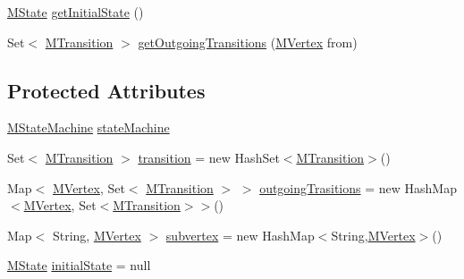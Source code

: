 \begin{DoxyCompactItemize}
\item 
\hyperlink{classorg_1_1tzi_1_1use_1_1uml_1_1mm_1_1statemachines_1_1_m_state}{M\-State} \hyperlink{classorg_1_1tzi_1_1use_1_1uml_1_1mm_1_1statemachines_1_1_m_region_a70cbf40280897244e43520925d189ca4}{get\-Initial\-State} ()
\item 
Set$<$ \hyperlink{classorg_1_1tzi_1_1use_1_1uml_1_1mm_1_1statemachines_1_1_m_transition}{M\-Transition} $>$ \hyperlink{classorg_1_1tzi_1_1use_1_1uml_1_1mm_1_1statemachines_1_1_m_region_a9e3f6533ed94322d263330b3c5cfa463}{get\-Outgoing\-Transitions} (\hyperlink{classorg_1_1tzi_1_1use_1_1uml_1_1mm_1_1statemachines_1_1_m_vertex}{M\-Vertex} from)
\end{DoxyCompactItemize}
\subsection*{Protected Attributes}
\begin{DoxyCompactItemize}
\item 
\hyperlink{classorg_1_1tzi_1_1use_1_1uml_1_1mm_1_1statemachines_1_1_m_state_machine}{M\-State\-Machine} \hyperlink{classorg_1_1tzi_1_1use_1_1uml_1_1mm_1_1statemachines_1_1_m_region_a97b6df0d73e6b6daa4c1684058a125c1}{state\-Machine}
\item 
Set$<$ \hyperlink{classorg_1_1tzi_1_1use_1_1uml_1_1mm_1_1statemachines_1_1_m_transition}{M\-Transition} $>$ \hyperlink{classorg_1_1tzi_1_1use_1_1uml_1_1mm_1_1statemachines_1_1_m_region_abd3bcba4d92d06c6b0962474302e6eaa}{transition} = new Hash\-Set$<$\hyperlink{classorg_1_1tzi_1_1use_1_1uml_1_1mm_1_1statemachines_1_1_m_transition}{M\-Transition}$>$()
\item 
Map$<$ \hyperlink{classorg_1_1tzi_1_1use_1_1uml_1_1mm_1_1statemachines_1_1_m_vertex}{M\-Vertex}, Set$<$ \hyperlink{classorg_1_1tzi_1_1use_1_1uml_1_1mm_1_1statemachines_1_1_m_transition}{M\-Transition} $>$ $>$ \hyperlink{classorg_1_1tzi_1_1use_1_1uml_1_1mm_1_1statemachines_1_1_m_region_aab3d4cbd873535285ab6cc0161cba8a5}{outgoing\-Trasitions} = new Hash\-Map$<$\hyperlink{classorg_1_1tzi_1_1use_1_1uml_1_1mm_1_1statemachines_1_1_m_vertex}{M\-Vertex}, Set$<$\hyperlink{classorg_1_1tzi_1_1use_1_1uml_1_1mm_1_1statemachines_1_1_m_transition}{M\-Transition}$>$$>$()
\item 
Map$<$ String, \hyperlink{classorg_1_1tzi_1_1use_1_1uml_1_1mm_1_1statemachines_1_1_m_vertex}{M\-Vertex} $>$ \hyperlink{classorg_1_1tzi_1_1use_1_1uml_1_1mm_1_1statemachines_1_1_m_region_aae24f4f3b13d9d4d6af46decbdb25876}{subvertex} = new Hash\-Map$<$String,\hyperlink{classorg_1_1tzi_1_1use_1_1uml_1_1mm_1_1statemachines_1_1_m_vertex}{M\-Vertex}$>$()
\item 
\hyperlink{classorg_1_1tzi_1_1use_1_1uml_1_1mm_1_1statemachines_1_1_m_state}{M\-State} \hyperlink{classorg_1_1tzi_1_1use_1_1uml_1_1mm_1_1statemachines_1_1_m_region_a4bc09b05d9e5273e351c92654494de8f}{initial\-State} = null
\end{DoxyCompactItemize}


